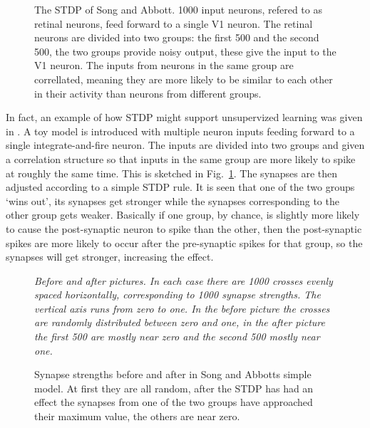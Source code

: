 \documentclass[12pt]{article}
\begin{document}
\begin{figure}
{\begin{center}
\end{center}
}
\caption{The STDP of Song and Abbott. 1000 input neurons, refered to
  as retinal neurons, feed forward to a single V1 neuron. The retinal
  neurons are divided into two groups: the first 500 and the second
  500, the two groups provide noisy output, these give the input to
  the V1 neuron. The inputs from neurons in the same group are
  correllated, meaning they are more likely to be similar to each other in their activity than neurons from different groups.\label{fig:sa_stdp}}
\end{figure}

In fact, an example of how STDP might support unsupervized learning
was given in \cite{SongEtAl2000a,SongAbbott2001a}. A toy model is
introduced with multiple neuron inputs feeding forward to a single
integrate-and-fire neuron. The inputs are divided into two groups and
given a correlation structure so that inputs in the same group are
more likely to spike at roughly the same time. This is sketched in
Fig.~\ref{fig:sa_stdp}. The synapses are then adjusted according to a
simple STDP rule. It is seen that one of the two groups \lq{}wins
out\rq{}, its synapses get stronger while the synapses corresponding
to the other group gets weaker. Basically if one group, by chance, is
slightly more likely to cause the post-synaptic neuron to spike than
the other, then the post-synaptic spikes are more likely to occur
after the pre-synaptic spikes for that group, so the synapses will get
stronger, increasing the effect.


\begin{figure}
             {\textsl{Before and after pictures. In each case there are 1000 crosses evenly spaced horizontally, corresponding to 1000 synapse strengths. The vertical axis runs from zero to one. In the before picture the crosses are randomly distributed between zero and one, in the after picture the first 500 are mostly near zero and the second 500 mostly near one.
                 }}
{
  }
\caption{Synapse strengths before and after in Song and Abbotts simple model. At first they are all random, after the STDP has had an effect the synapses from one of the two groups have approached their maximum value, the others are near zero. \label{fig:before_after}}
\end{figure}
\end{document}
